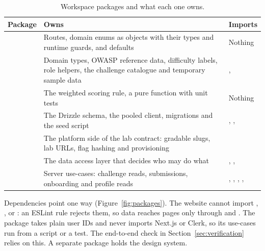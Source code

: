 \begin{table}[!htbp]
\centering
\caption{Workspace packages and what each one owns.}
\label{tab:packages}
\tablefont
\begin{tabularx}{\linewidth}{@{}P{2.2cm} L P{3.6cm}@{}}
\toprule
\textbf{Package} & \textbf{Owns} & \textbf{Imports} \\
\midrule
{} & Routes, domain enums as  objects with their types and runtime guards, and defaults & Nothing \\
 & Domain types, OWASP reference data, difficulty labels, role helpers, the challenge catalogue and temporary sample data & ,  \\
 & The weighted scoring rule, a pure function with unit tests & Nothing \\
 & The Drizzle schema, the pooled client, migrations and the seed script & , ,  \\
 & The platform side of the lab contract: gradable slugs, lab URLs, flag hashing and provisioning &  \\
 & The data access layer that decides who may do what & , ,  \\
 & Server use-cases: challenge reads, submissions, onboarding and profile reads & , , , ,  \\
\bottomrule
\end{tabularx}
\end{table}

Dependencies point one way (Figure~\ref{fig:packages}). The website cannot import , ,  or : an ESLint  rule rejects them, so data reaches pages only through  and . The  package takes plain user IDs and never imports Next.js or Clerk, so its use-cases run from a script or a test. The end-to-end check in Section~\ref{sec:verification} relies on this. A separate  package holds the design system.


